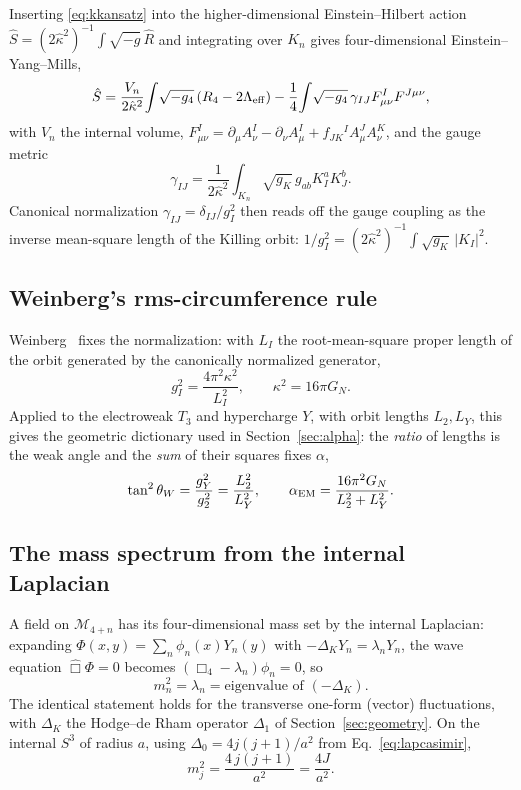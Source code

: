 \documentclass[11pt]{article}
\theoremstyle{plain}
\theoremstyle{definition}
\newcommand{\cM}{\mathcal{M}}
\begin{document}
Inserting \eqref{eq:kkansatz} into the higher-dimensional Einstein--Hilbert
action $\hat S=(2\hat\kappa^2)^{-1}\!\int\!\sqrt{-\hat g}\,\hat R$ and
integrating over $K_n$ gives four-dimensional Einstein--Yang--Mills,
\begin{equation}
\hat S=\frac{V_n}{2\hat\kappa^2}\!\int\!\sqrt{-g_4}\,(R_4-2\Lambda_{\rm eff})
-\frac14\!\int\!\sqrt{-g_4}\,\gamma_{IJ}F^I_{\mu\nu}F^{J\mu\nu},
\end{equation}
with $V_n$ the internal volume, $F^I_{\mu\nu}=\partial_\mu A^I_\nu-\partial_\nu
A^I_\mu+f_{JK}{}^IA^J_\mu A^K_\nu$, and the gauge metric
\begin{equation}
\gamma_{IJ}=\frac1{2\hat\kappa^2}\int_{K_n}\!\sqrt{g_K}\,g_{ab}K^a_IK^b_J .
\label{eq:gaugemetric}
\end{equation}
Canonical normalization $\gamma_{IJ}=\delta_{IJ}/g_I^2$ then reads off the
gauge coupling as the inverse mean-square length of the Killing orbit:
$1/g_I^2=(2\hat\kappa^2)^{-1}\!\int\!\sqrt{g_K}\,|K_I|^2$.

\subsection{Weinberg's rms-circumference rule}

Weinberg~\cite{Weinberg1983} fixes the normalization: with $L_I$ the
root-mean-square proper length of the orbit generated by the canonically
normalized generator,
\begin{equation}
\boxed{\;g_I^2=\frac{4\pi^2\kappa^2}{L_I^2},\qquad \kappa^2=16\pi G_N.\;}
\label{eq:weinbergrule}
\end{equation}
Applied to the electroweak $T_3$ and hypercharge $Y$, with orbit lengths
$L_2,L_Y$, this gives the geometric dictionary used in
Section~\ref{sec:alpha}: the \emph{ratio} of lengths is the weak angle and the
\emph{sum} of their squares fixes $\alpha$,
\begin{equation}
\tan^2\theta_W=\frac{g_Y^2}{g_2^2}=\frac{L_2^2}{L_Y^2},
\qquad
\alpha_{\rm EM}=\frac{16\pi^2G_N}{L_2^2+L_Y^2}.
\label{eq:weinbergangle}
\end{equation}

\subsection{The mass spectrum from the internal Laplacian}

A field on $\cM_{4+n}$ has its four-dimensional mass set by the internal
Laplacian: expanding $\Phi(x,y)=\sum_n\phi_n(x)Y_n(y)$ with
$-\Delta_K Y_n=\lambda_n Y_n$, the wave equation $\hat\Box\Phi=0$ becomes
$(\Box_4-\lambda_n)\phi_n=0$, so
\begin{equation}
m_n^2=\lambda_n=\text{eigenvalue of }(-\Delta_K).
\label{eq:kkmass}
\end{equation}
The identical statement holds for the transverse one-form (vector)
fluctuations, with $\Delta_K$ the Hodge--de Rham operator $\Delta_1$ of
Section~\ref{sec:geometry}. On the internal $S^3$ of radius $a$, using
$\Delta_0=4j(j+1)/a^2$ from Eq.~\eqref{eq:lapcasimir},
\begin{equation}
m_j^2=\frac{4\,j(j+1)}{a^2}=\frac{4J}{a^2}.
\label{eq:masscasimir}
\end{equation}
\end{document}
